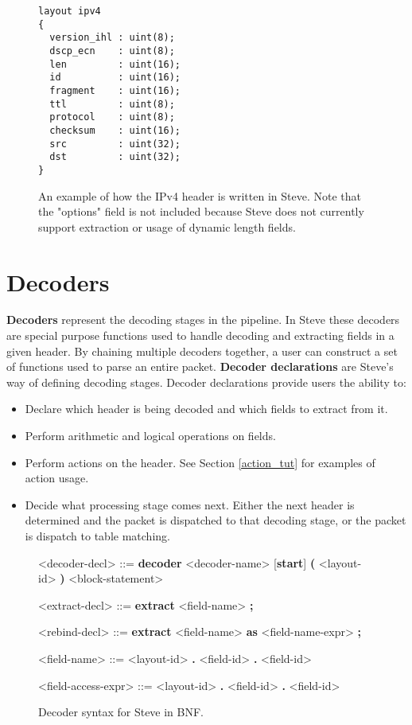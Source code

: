 \begin{figure}[ht]
\begin{lstlisting}
layout ipv4
{
  version_ihl : uint(8);
  dscp_ecn    : uint(8);
  len         : uint(16);
  id          : uint(16);
  fragment    : uint(16);
  ttl         : uint(8);
  protocol    : uint(8);
  checksum    : uint(16);
  src         : uint(32);
  dst         : uint(32);
}
\end{lstlisting}
\caption{An example of how the IPv4 header is written in Steve. Note that the "options" field is not included because Steve does not currently support extraction or usage of dynamic length fields.}
\label{fg:ipv4_layout_ex}
\end{figure}

\section{Decoders} \label{decoder_tut}

\textbf{Decoders} represent the decoding stages in the pipeline. In Steve these decoders  are special purpose functions used to handle decoding and extracting fields in a given header. By chaining multiple decoders together, a user can construct a set of functions used to parse an entire packet. \textbf{Decoder declarations} are Steve's way of defining decoding stages. Decoder declarations provide users the ability to:

\begin{itemize}
\item Declare which header is being decoded and which fields to extract from it.
\item Perform arithmetic and logical operations on fields.
\item Perform actions on the header. See Section \ref{action_tut} for examples of action usage.
\item Decide what processing stage comes next. Either the next header is determined and the packet is dispatched to that decoding stage, or the packet is dispatch to table matching.
\end{itemize}

\begin{figure}[ht]
\begin{mdframed}
\begin{grammar}

<decoder-decl> ::=
\textbf{decoder} <decoder-name> [\textbf{start}] 
\textbf{(} <layout-id> \textbf{)}
<block-statement>

<extract-decl> ::=
\textbf{extract} <field-name> \textbf{;}

<rebind-decl> ::=
\textbf{extract} <field-name> \textbf{as} <field-name-expr> \textbf{;}

<field-name> ::=
<layout-id> \textbf{.} <field-id>
 \textbf{.} <field-id>

<field-access-expr> ::=
<layout-id> \textbf{.} <field-id>
 \textbf{.} <field-id>

\end{grammar}
\end{mdframed}
\caption{Decoder syntax for Steve in BNF.}
\label{fg:decoder_syntax}
\end{figure}

